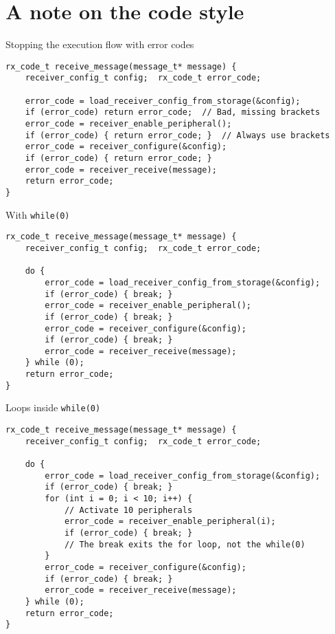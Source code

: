 \documentclass[aspectratio=169,14pt]{beamer}
\begin{document}
\section{A note on the code style}

\begin{frame}[fragile]{Stopping the execution flow with error codes}
\begin{lstlisting}[style=cstyle]
rx_code_t receive_message(message_t* message) {
    receiver_config_t config;  rx_code_t error_code;
    
    error_code = load_receiver_config_from_storage(&config);
    if (error_code) return error_code;  // Bad, missing brackets
    error_code = receiver_enable_peripheral();
    if (error_code) { return error_code; }  // Always use brackets
    error_code = receiver_configure(&config);
    if (error_code) { return error_code; }
    error_code = receiver_receive(message);
    return error_code;
}
\end{lstlisting}
\end{frame}

\begin{frame}[fragile]{With \texttt{while(0)}}
\begin{lstlisting}[style=cstyle]
rx_code_t receive_message(message_t* message) {
    receiver_config_t config;  rx_code_t error_code;
    
    do {
        error_code = load_receiver_config_from_storage(&config);
        if (error_code) { break; }
        error_code = receiver_enable_peripheral();
        if (error_code) { break; }
        error_code = receiver_configure(&config);
        if (error_code) { break; }
        error_code = receiver_receive(message);
    } while (0);
    return error_code;
}
\end{lstlisting}
\end{frame}

\begin{frame}[fragile]{Loops inside \texttt{while(0)}}
\begin{lstlisting}[style=cstyle]
rx_code_t receive_message(message_t* message) {
    receiver_config_t config;  rx_code_t error_code;
    
    do {
        error_code = load_receiver_config_from_storage(&config);
        if (error_code) { break; }
        for (int i = 0; i < 10; i++) {
            // Activate 10 peripherals
            error_code = receiver_enable_peripheral(i);
            if (error_code) { break; }
            // The break exits the for loop, not the while(0)
        }
        error_code = receiver_configure(&config);
        if (error_code) { break; }
        error_code = receiver_receive(message);
    } while (0);
    return error_code;
}
\end{lstlisting}
\end{frame}
\end{document}

